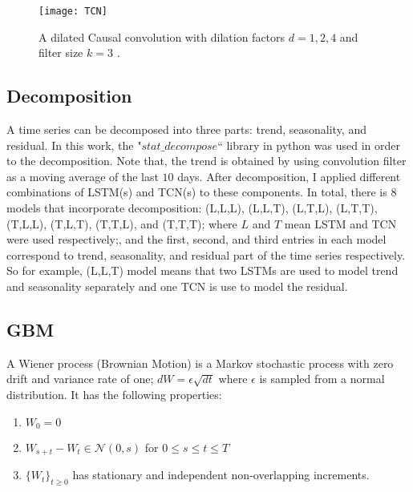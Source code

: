 \documentclass[12pt, A4]{article}
\begin{document}
\begin{figure}[H]
	\centering
	\texttt{[image: TCN]}
	\caption{A dilated Causal convolution with dilation factors $d=1,2,4$ and filter size $k=3$ \cite{bai2018empirical}.}
	\label{TCN_arch}
\end{figure}

\subsection{Decomposition}
A time series can be decomposed into three parts: trend, seasonality, and residual. In this work, the "$stat\_decompose$`` library in python was used in order to the decomposition. Note that, the trend is obtained by using convolution filter as a moving average of the last $10$ days. After decomposition, I applied different combinations of LSTM(s) and TCN(s) to these components. In total, there is $8$ models that incorporate decomposition: (L,L,L), (L,L,T), (L,T,L), (L,T,T), (T,L,L), (T,L,T), (T,T,L), and (T,T,T); where $L$ and $T$ mean LSTM  and TCN were used respectively;, and the first, second, and third entries in each model correspond to trend, seasonality, and residual part of the time series respectively. So for example, (L,L,T) model means that two LSTMs are used to model trend and seasonality separately and one TCN is use to model the residual. \\

\subsection{GBM}

A Wiener process (Brownian Motion) is a Markov stochastic process with zero drift and variance rate of one; $dW = \epsilon \sqrt{dt}$ where $\epsilon$ is sampled from a normal distribution. It has the following properties:
\begin{enumerate}
	\item $W_{0}=0$
	\item $W_{s+t}-W_{t} \in \mathcal{N}(0,s)$ for $0\leq s\leq t \leq T$
	\item $\{W_{t}\}_{t\geq 0}$ has stationary and independent non-overlapping increments. 
\end{enumerate}
 
\end{document}
